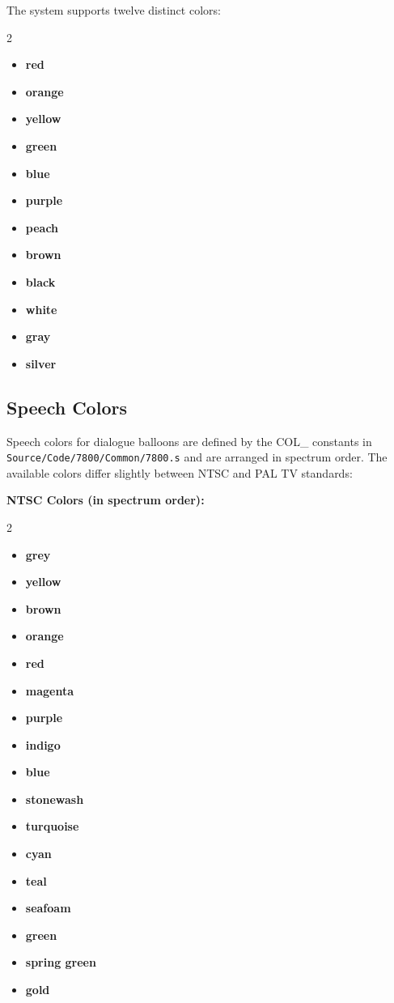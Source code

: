 \documentclass[11pt,letterpaper,oldstylefigures]{memoir}
\newcommand{\paragraphbreak}{\vspace{0.5em}}
\newcommand{\fountain}[1]{\textbf{#1}}
\begin{document}
The system supports twelve distinct colors:
\begin{multicols}{2}
\begin{itemize}
\item \fountain{red}
\item \fountain{orange}
\item \fountain{yellow}
\item \fountain{green}
\item \fountain{blue}
\item \fountain{purple}
\item \fountain{peach}
\item \fountain{brown}
\item \fountain{black}
\item \fountain{white}
\item \fountain{gray}
\item \fountain{silver}
\end{itemize}
\end{multicols}

\subsection{Speech Colors}
\paragraphbreak

Speech colors for dialogue balloons are defined by the COL\_ constants in \texttt{Source/Code/7800/Common/7800.s} and are arranged in spectrum order. The available colors differ slightly between NTSC and PAL TV standards:

\textbf{NTSC Colors (in spectrum order):}
\begin{multicols}{2}
\begin{itemize}
\item \fountain{grey}
\item \fountain{yellow}
\item \fountain{brown}
\item \fountain{orange}
\item \fountain{red}
\item \fountain{magenta}
\item \fountain{purple}
\item \fountain{indigo}
\item \fountain{blue}
\item \fountain{stonewash}
\item \fountain{turquoise}
\item \fountain{cyan}
\item \fountain{teal}
\item \fountain{seafoam}
\item \fountain{green}
\item \fountain{spring green}
\item \fountain{gold}
\end{itemize}
\end{multicols}
\end{document}
